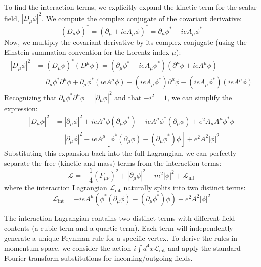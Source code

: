 To find the interaction terms, we explicitly expand the kinetic term for the scalar field, $|D_\mu\phi|^2$. We compute the complex conjugate of the covariant derivative:
\[
    (D_\mu\phi)^* = (\partial_\mu + ieA_\mu\phi)^* = \partial_\mu\phi^* - ieA_\mu\phi^*
\]
Now, we multiply the covariant derivative by its complex conjugate (using the Einstein summation convention for the Lorentz index $\mu$):
\[
    \begin{aligned}
        |D_\mu\phi|^2 & = (D_\mu\phi)^* (D^\mu\phi) = (\partial_\mu\phi^* - ieA_\mu\phi^*)(\partial^\mu\phi + ieA^\mu\phi)                                         \\
                      & = \partial_\mu\phi^* \partial^\mu\phi + \partial_\mu\phi^* (ieA^\mu\phi) - (ieA_\mu\phi^*) \partial^\mu\phi - (ieA_\mu\phi^*)(ieA^\mu\phi)
    \end{aligned}
\]
Recognizing that $\partial_\mu\phi^* \partial^\mu\phi = |\partial_\mu\phi|^2$ and that $-i^2 = 1$, we can simplify the expression:
\[
    \begin{aligned}
        |D_\mu\phi|^2 & = |\partial_\mu\phi|^2 + ieA^\mu\phi(\partial_\mu\phi^*) - ieA^\mu\phi^*(\partial_\mu\phi) + e^2 A_\mu A^\mu \phi^* \phi \\
                      & = |\partial_\mu\phi|^2 - ieA^\mu \left[ \phi^*(\partial_\mu\phi) - (\partial_\mu\phi^*)\phi \right] + e^2 A^2 |\phi|^2
    \end{aligned}
\]
Substituting this expansion back into the full Lagrangian, we can perfectly separate the free (kinetic and mass) terms from the interaction terms:
\[
    \mathcal{L} = -\frac{1}{4}(F_{\mu\nu})^2 + |\partial_\mu\phi|^2 - m^2|\phi|^2 + \mathcal{L}_{\text{int}}
\]
where the interaction Lagrangian $\mathcal{L}_{\text{int}}$ naturally splits into two distinct terms:
\[
    \mathcal{L}_{\text{int}} = -ieA^\mu \left( \phi^*(\partial_\mu\phi) - (\partial_\mu\phi^*)\phi \right) + e^2 A^2 |\phi|^2
\]

The interaction Lagrangian contains two distinct terms with different field contents (a cubic term and a quartic term). Each term will independently generate a unique Feynman rule for a specific vertex. To derive the rules in momentum space, we consider the action $i \int d^4x \mathcal{L}_{\text{int}}$ and apply the standard Fourier transform substitutions for incoming/outgoing fields.

